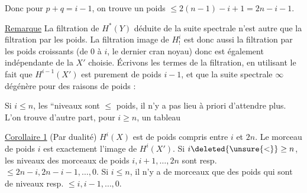 Donc  pour $p+q=i-1$, on trouve un poids $\le 2(n-1)-i+1=2n-i-1$.

\uline{Remarque} \quad La filtration de $H^*(Y)$ déduite de la suite spectrale  n'est autre que la filtration par les poids. La filtration image de $H^i_!$ est donc aussi la filtration par les poids croissants (de $0$ à $i$, le dernier cran  noyau) donc est également indépendante de la  $X'$ choisie. Écrivons les termes de la filtration, en utilisant le fait que $H^{i-1}(X')$ est purement de poids $i-1$, et  que la suite spectrale $\infty$ dégénère pour des raisons de poids :


 Si $i\le n$, les \textquotedblleft{}niveaux sont  $\le$ poids, il n'y a pas lieu à priori d'attendre plus. L'on trouve d'autre part, pour $i\ge n$, un tableau


\uline{Corollaire 1} \quad (Par dualité) $H^i(X)$ est de poids compris entre $i$ et $2n$. Le morceau  de poids $i$ est exactement l'image de $H^i(X')$. Si $i\deleted{\unsure{<}}\ge n$, les niveaux des morceaux de poids $i,i+1,\ldots,2n$ sont resp. $\le 2n-i,2n-i-1,\ldots,0$. Si $i\le n$, il n'y a de morceaux  que des poids   qui sont de niveaux resp. $\le i,i-1,\ldots,0$.

